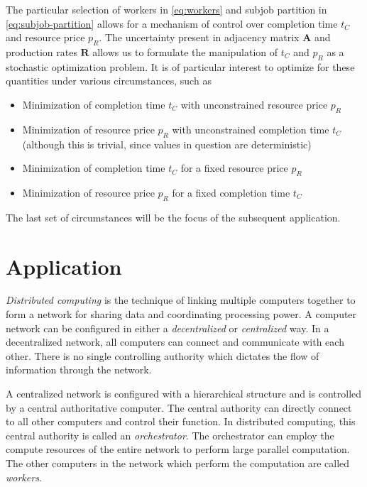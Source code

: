 \documentclass[../mthe-493-project-proposal.tex]{subfiles}
\begin{document}
    The particular selection of workers in \eqref{eq:workers} and subjob partition in \eqref{eq:subjob-partition} allows for a mechanism of control over completion time $t_C$ and resource price $p_R$. The uncertainty present in adjacency matrix $\mathbf{A}$ and production rates $\mathbf{R}$ allows us to formulate the manipulation of $t_C$ and $p_R$ as a stochastic optimization problem. It is of particular interest to optimize for these quantities under various circumstances, such as
    \begin{itemize}
        \item Minimization of completion time $t_C$ with unconstrained resource price $p_R$
        \item Minimization of resource price $p_R$ with unconstrained completion time $t_C$ (although this is trivial, since values in question are deterministic)
        \item Minimization of completion time $t_C$ for a fixed resource price $p_R$
        \item Minimization of resource price $p_R$ for a fixed completion time $t_C$
    \end{itemize}
    The last set of circumstances will be the focus of the subsequent application.

    \section{Application}

    \textit{Distributed computing} is the technique of linking multiple computers together to form a network for sharing data and coordinating processing power. A computer network can be configured in either a \textit{decentralized} or \textit{centralized} way. In a decentralized network, all computers can connect and communicate with each other. There is no single controlling authority which dictates the flow of information through the network.

    A centralized network is configured with a hierarchical structure and is controlled by a central authoritative computer. The central authority can directly connect to all other computers and control their function. In distributed computing, this central authority is called an \textit{orchestrator}. The orchestrator can employ the compute resources of the entire network to perform large parallel computation. The other computers in the network which perform the computation are called \textit{workers}.
\end{document}

